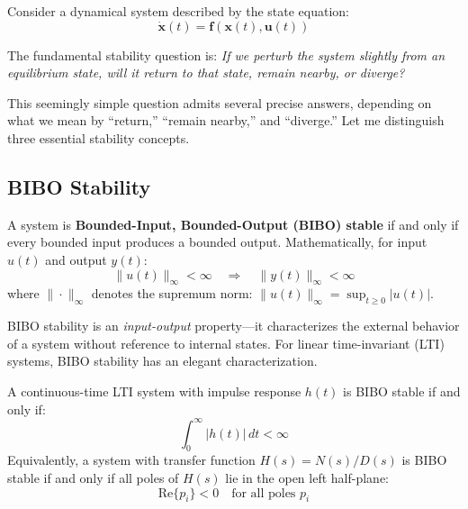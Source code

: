 Consider a dynamical system described by the state equation:
\begin{equation}
\dot{\mathbf{x}}(t) = \mathbf{f}(\mathbf{x}(t), \mathbf{u}(t))
\label{eq:general_dynamics}
\end{equation}

The fundamental stability question is: \textit{If we perturb the system slightly from an equilibrium state, will it return to that state, remain nearby, or diverge?}

This seemingly simple question admits several precise answers, depending on what we mean by ``return,'' ``remain nearby,'' and ``diverge.'' Let me distinguish three essential stability concepts.

\subsection{BIBO Stability}

\begin{definition}
\label{def:bibo_stability}
A system is \textbf{Bounded-Input, Bounded-Output (BIBO) stable} if and only if every bounded input produces a bounded output. Mathematically, for input $u(t)$ and output $y(t)$:
\begin{equation}
\|u(t)\|_\infty < \infty \quad \Rightarrow \quad \|y(t)\|_\infty < \infty
\end{equation}
where $\|\cdot\|_\infty$ denotes the supremum norm: $\|u(t)\|_\infty = \sup_{t \geq 0} |u(t)|$.
\end{definition}

BIBO stability is an \textit{input-output} property---it characterizes the external behavior of a system without reference to internal states. For linear time-invariant (LTI) systems, BIBO stability has an elegant characterization.

\begin{theorem}
\label{thm:bibo_lti}
A continuous-time LTI system with impulse response $h(t)$ is BIBO stable if and only if:
\begin{equation}
\int_0^\infty |h(t)| \, dt < \infty
\end{equation}
Equivalently, a system with transfer function $H(s) = N(s)/D(s)$ is BIBO stable if and only if all poles of $H(s)$ lie in the open left half-plane:
\begin{equation}
\text{Re}\{p_i\} < 0 \quad \text{for all poles } p_i
\end{equation}
\end{theorem}

